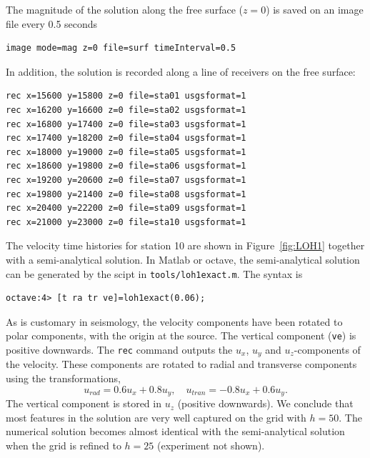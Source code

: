 \documentclass[11pt]{report}
\begin{document}
The magnitude of the solution along the free surface ($z=0$) is saved on an image file every 0.5
seconds
\begin{verbatim}
image mode=mag z=0 file=surf timeInterval=0.5
\end{verbatim}
In addition, the solution is recorded along a line of receivers on the free surface:
\begin{verbatim}
rec x=15600 y=15800 z=0 file=sta01 usgsformat=1
rec x=16200 y=16600 z=0 file=sta02 usgsformat=1
rec x=16800 y=17400 z=0 file=sta03 usgsformat=1
rec x=17400 y=18200 z=0 file=sta04 usgsformat=1
rec x=18000 y=19000 z=0 file=sta05 usgsformat=1
rec x=18600 y=19800 z=0 file=sta06 usgsformat=1
rec x=19200 y=20600 z=0 file=sta07 usgsformat=1
rec x=19800 y=21400 z=0 file=sta08 usgsformat=1
rec x=20400 y=22200 z=0 file=sta09 usgsformat=1
rec x=21000 y=23000 z=0 file=sta10 usgsformat=1
\end{verbatim}
The velocity time histories for station 10 are shown in Figure~\ref{fig:LOH1} together with a
semi-analytical solution. In Matlab or octave, the semi-analytical solution can be generated by the
scipt in \verb+tools/loh1exact.m+. The syntax is
\begin{verbatim}
octave:4> [t ra tr ve]=loh1exact(0.06);
\end{verbatim}
As is customary in seismology, the velocity components have been rotated to polar components, with
the origin at the source. The vertical component (\verb+ve+) is positive downwards. The {\tt rec}
command outputs the $u_x$, $u_y$ and $u_z$-components of the velocity. These components are rotated
to radial and transverse components using the transformations,
\[
u_{rad} = 0.6 u_x + 0.8 u_y,\quad u_{tran} = -0.8 u_x + 0.6 u_y.
\]
The vertical component is stored in $u_z$ (positive downwards). We conclude that most features in
the solution are very well captured on the grid with $h=50$. The numerical solution becomes almost
identical with the semi-analytical solution when the grid is refined to $h=25$ (experiment not shown).
\end{document}
